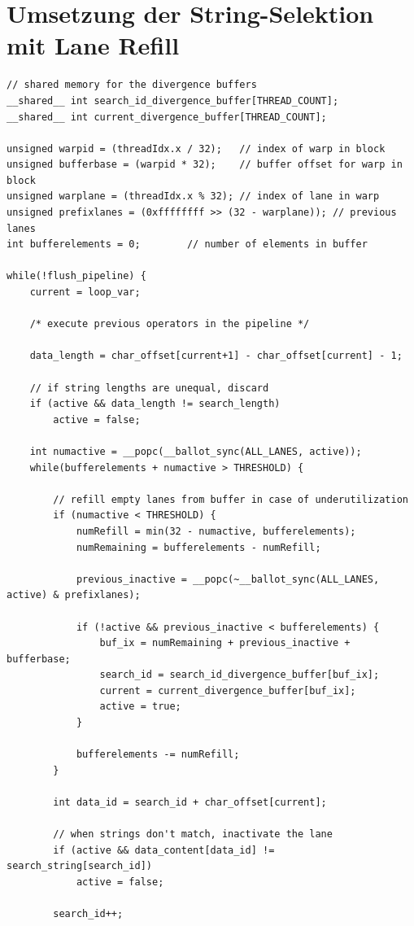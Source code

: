 \chapter{Umsetzung der String-Selektion mit Lane Refill}
\label{apx:equals_lane_refill}

\begin{lstlisting}[language=MyC++,
caption=Umsetzung der String-Selektion mit Lane Refill]
// shared memory for the divergence buffers
__shared__ int search_id_divergence_buffer[THREAD_COUNT];
__shared__ int current_divergence_buffer[THREAD_COUNT];

unsigned warpid = (threadIdx.x / 32);	// index of warp in block
unsigned bufferbase = (warpid * 32);    // buffer offset for warp in block
unsigned warplane = (threadIdx.x % 32); // index of lane in warp
unsigned prefixlanes = (0xffffffff >> (32 - warplane)); // previous lanes
int bufferelements = 0;        // number of elements in buffer

while(!flush_pipeline) {
	current = loop_var;
	
	/* execute previous operators in the pipeline */
	
	data_length = char_offset[current+1] - char_offset[current] - 1;
	
	// if string lengths are unequal, discard
	if (active && data_length != search_length)
		active = false;
	
	int numactive = __popc(__ballot_sync(ALL_LANES, active));
	while(bufferelements + numactive > THRESHOLD) {
	
		// refill empty lanes from buffer in case of underutilization
		if (numactive < THRESHOLD) {
			numRefill = min(32 - numactive, bufferelements);
			numRemaining = bufferelements - numRefill;
			
			previous_inactive = __popc(~__ballot_sync(ALL_LANES, active) & prefixlanes);
			
			if (!active && previous_inactive < bufferelements) {
				buf_ix = numRemaining + previous_inactive + bufferbase;
				search_id = search_id_divergence_buffer[buf_ix];
				current = current_divergence_buffer[buf_ix];
				active = true;
			}
			
			bufferelements -= numRefill;
		}
	
		int data_id = search_id + char_offset[current];
		
		// when strings don't match, inactivate the lane
		if (active && data_content[data_id] != search_string[search_id])
			active = false;
		
		search_id++;
		

\end{lstlisting}
